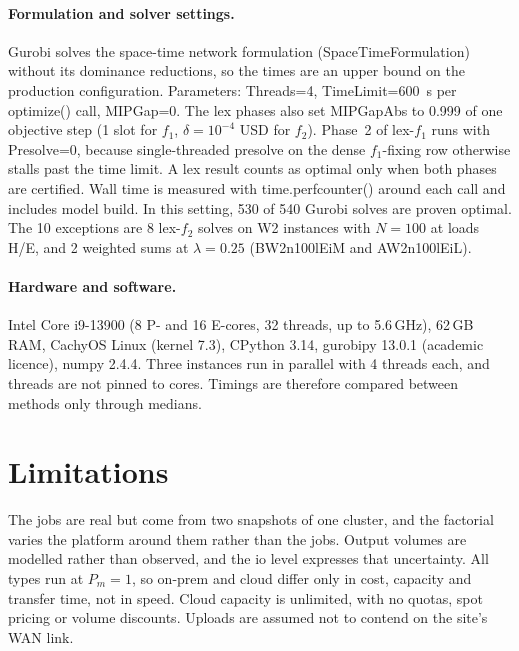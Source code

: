\documentclass[11pt,a4paper]{article}
\newcommand{\codeus}{\textunderscore\allowbreak}
\newcommand{\code}[1]{{\ttfamily\let\_\codeus #1}}
\begin{document}
\paragraph{Formulation and solver settings.} Gurobi solves the space-time network
formulation (\code{SpaceTimeFormulation}) without its dominance reductions, so the
times are an upper bound on the production configuration. Parameters:
\code{Threads}=4, \code{TimeLimit}=\SI{600}{s} per \code{optimize()} call,
\code{MIPGap}=0. The lex phases also set \code{MIPGapAbs} to 0.999 of one objective
step (1 slot for $f_1$, $\delta=10^{-4}$ USD for $f_2$). Phase~2 of lex-$f_1$ runs
with \code{Presolve}=0, because single-threaded presolve on the dense $f_1$-fixing
row otherwise stalls past the time limit. A lex result counts as optimal only when
both phases are certified. Wall time is measured with \code{time.perf\_counter()}
around each call and includes model build. In this setting, 530 of 540 Gurobi
solves are proven optimal. The 10 exceptions are 8 lex-$f_2$ solves on
W2 instances with $N=100$ at loads H/E, and 2 weighted sums at
$\lambda=0.25$ (\code{B\_W2\_n100\_lE\_iM} and \code{A\_W2\_n100\_lE\_iL}).

\paragraph{Hardware and software.} Intel Core i9-13900 (8 P- and 16 E-cores, 32
threads, up to 5.6\,GHz), 62\,GB RAM, CachyOS Linux (kernel 7.3), CPython 3.14,
gurobipy 13.0.1 (academic licence), numpy 2.4.4. Three instances run in parallel
with 4 threads each, and threads are not pinned to cores. Timings are therefore
compared between methods only through medians.

\section{Limitations}\label{sec:limits}
The jobs are real but come from two snapshots of one cluster, and the factorial
varies the platform around them rather than the jobs. Output volumes are modelled
rather than observed, and the io level expresses that uncertainty. All types run
at $P_m=1$, so on-prem and cloud differ only in cost, capacity and transfer time,
not in speed. Cloud capacity is unlimited, with no quotas, spot pricing or volume
discounts. Uploads are assumed not to contend on the site's WAN link.
\end{document}
